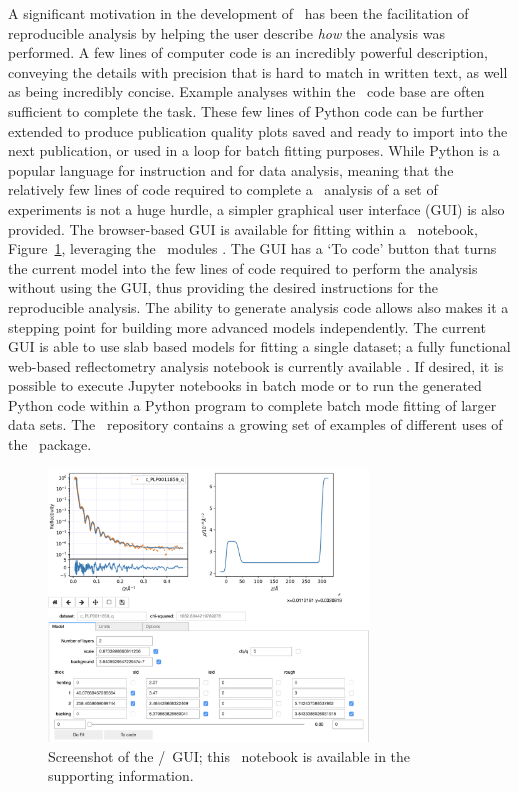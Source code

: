 \documentclass[pdf,preprint]{iucr}
\begin{document}
A significant motivation in the development of \ has been the facilitation of reproducible analysis by helping the user describe \emph{how} the analysis was performed. A few lines of computer code is an incredibly powerful description, conveying the details with precision that is hard to match in written text, as well as being incredibly concise.
Example analyses within the \ code base are often sufficient to complete the task.
These few lines of Python code can be further extended to produce publication quality plots saved and ready to import into the next publication, or used in a loop for batch fitting purposes.
While Python is a popular language for instruction and for data analysis, meaning that the relatively few lines of code required to complete a \ analysis of a set of experiments is not a huge hurdle, a simpler graphical user interface (GUI) is also provided.
The browser-based GUI is available for fitting within a \Jupyter\ notebook, Figure~\ref{fig:gui}, leveraging the \ipywidgets\ modules \cite{ipywidgets}. The GUI has a `To code' button that turns the current model into the few lines of code required to perform the analysis without using the GUI, thus providing the desired instructions for the reproducible analysis. The ability to generate analysis code allows also makes it a stepping point for building more advanced models independently.
The current GUI is able to use slab based models for fitting a single dataset; a fully functional web-based reflectometry analysis notebook is currently available \cite{Nelson2018}.
If desired, it is possible to execute Jupyter notebooks in batch mode or to run the generated Python code within a Python program to complete batch mode fitting of larger data sets. The \ repository contains a growing set of examples of different uses of the \ package.

\begin{figure}
  \includegraphics[width=85mm]{./supporting_information/gui.png}
  \caption{Screenshot of the \Jupyter/\ipywidgets\ GUI; this \Jupyter\ notebook is available in the supporting information.}
  \label{fig:gui}
\end{figure}
\end{document}
